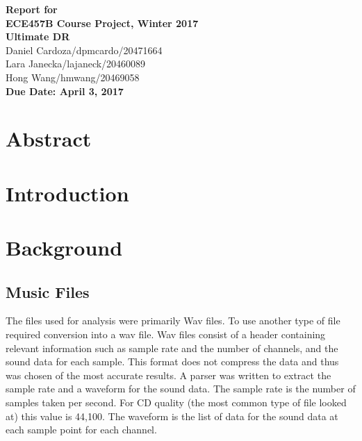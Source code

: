 \documentclass[12pt]{article}
\begin{document}
\begin{center}
{\Large\bf Report for}\\
\vspace{1mm}
{\Large\bf ECE457B Course Project, Winter 2017}\\
\vspace{2mm}
{\Large\bf Ultimate DR}\\
\vspace{4mm}
{Daniel Cardoza/dpmcardo/20471664}\\
{Lara Janecka/lajaneck/20460089}\\
{Hong Wang/hmwang/20469058}\\
\vspace{2mm}
\textbf{Due Date: April 3, 2017}
\end{center}

\def\question#1{\item[\bf #1.]}
\def\part#1{\item[\bf #1)]}
\newcommand{\pc}[1]{\mbox{\textbf{#1}}} %

\section{Abstract}

\pagebreak

\section{Introduction}

\pagebreak

\section{Background}
\subsection{Music Files}
The files used for analysis were primarily Wav files. To use another type of file required conversion into a wav file. Wav files consist of a header containing relevant information such as sample rate and the number of channels, and the sound data for each sample. This format does not compress the data and thus was chosen of the most accurate results. A parser was written to extract the sample rate and a waveform for the sound data. The sample rate is the number of samples taken per second. For CD quality (the most common type of file looked at) this value is 44,100. The waveform is the list of data for the sound data at each sample point for each channel.
\end{document}
